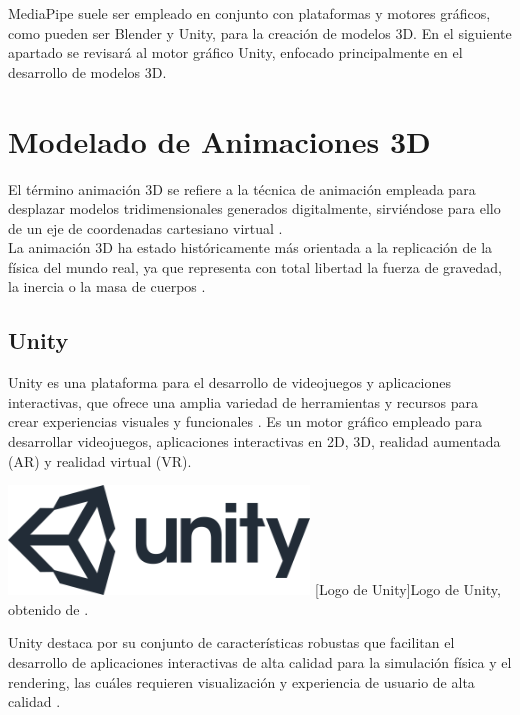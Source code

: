 MediaPipe suele ser empleado en conjunto con plataformas y motores gráficos, como pueden ser Blender y Unity, para la creación de modelos 3D. En el siguiente apartado se revisará al motor gráfico Unity, enfocado principalmente en el desarrollo de modelos 3D.\\

\section{Modelado de Animaciones 3D}
El término animación 3D se refiere a la técnica de animación empleada para desplazar modelos tridimensionales generados digitalmente, sirviéndose para ello de un eje de coordenadas cartesiano virtual \cite{ref54}.\\

La animación 3D ha estado históricamente más orientada a la replicación de la física del mundo real, ya que representa con total libertad la fuerza de gravedad, la inercia o la masa de cuerpos \cite{ref54}.

\subsection{Unity}
Unity es una plataforma para el desarrollo de videojuegos y aplicaciones interactivas, que ofrece una amplia variedad de herramientas y recursos para crear experiencias visuales y funcionales \cite{ref55}. Es un motor gráfico empleado para desarrollar videojuegos, aplicaciones interactivas en 2D, 3D, realidad aumentada (AR) y realidad virtual (VR).\\

\begin{center}
    \includegraphics[width=0.6\textwidth]{Images/Cap 2/Unity_Logo.png}
    [Logo de Unity]{Logo de Unity, obtenido de \cite{ref56}.} 
\end{center}

Unity destaca por su conjunto de características robustas que facilitan el desarrollo de aplicaciones interactivas de alta calidad para la simulación física y el rendering, las cuáles requieren visualización y experiencia de usuario de alta calidad \cite{ref55}.\\

